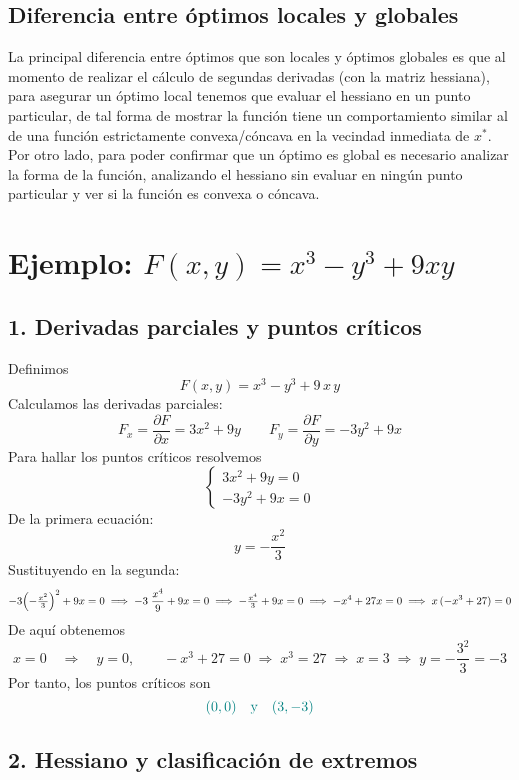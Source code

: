 \documentclass{article}
\begin{document}
\subsection*{Diferencia entre óptimos locales y globales}
La principal diferencia entre óptimos que son locales y óptimos globales es que al momento de realizar el cálculo de segundas derivadas (con la matriz hessiana), para asegurar un óptimo local tenemos que evaluar el hessiano en un punto particular, de tal forma de mostrar la función tiene un comportamiento similar al de una función estrictamente convexa/cóncava en la vecindad inmediata de $x^*$. Por otro lado, para poder confirmar que un óptimo es global es necesario analizar la forma de la función, analizando el hessiano sin evaluar en ningún punto particular y ver si la función es convexa o cóncava.



\section*{Ejemplo: \(F(x,y)=x^3 - y^3 + 9xy\)}

\subsection*{1. Derivadas parciales y puntos críticos}

Definimos
\[
F(x,y)=x^3 - y^3 + 9\,x\,y
\]
Calculamos las derivadas parciales:
\[
F_x = \frac{\partial F}{\partial x}
= 3x^2 + 9y
\qquad
F_y = \frac{\partial F}{\partial y}
= -3y^2 + 9x
\]
Para hallar los puntos críticos resolvemos
\[
\begin{cases}
3x^2 + 9y = 0\\[6pt]
-3y^2 + 9x = 0
\end{cases}
\]
De la primera ecuación:
\[
y = -\frac{x^2}{3}
\]
Sustituyendo en la segunda:
\[
-3\Bigl(-\tfrac{x^2}{3}\Bigr)^2 + 9x = 0
\;\Longrightarrow\;
-3\;\frac{x^4}{9} + 9x = 0
\;\Longrightarrow\;
-\tfrac{x^4}{3} + 9x = 0
\;\Longrightarrow\;
-x^4 + 27x = 0
\;\Longrightarrow\;
x\,( -x^3 + 27 ) = 0
\]
De aquí obtenemos
\[
x=0
\quad\Longrightarrow\quad y=0,
\qquad
-x^3 + 27 = 0
\;\Longrightarrow\;
x^3 = 27
\;\Longrightarrow\;
x = 3
\;\Longrightarrow\;
y = -\frac{3^2}{3} = -3
\]
Por tanto, los puntos críticos son
\[\color{teal}
(0,0)
\quad\text{y}\quad
(3,-3)
\]

\subsection*{2. Hessiano y clasificación de extremos}
\end{document}
